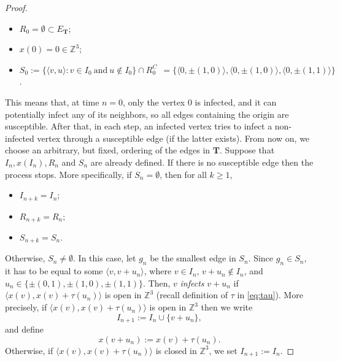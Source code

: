 \documentclass{aptpub}
\newcommand{\Z}{\mathbb{Z}}
\begin{document}
\begin{proof}
\begin{itemize}
    \item $R_0 = \emptyset \subset E_{\mathbf{T}}$;
    
    \item $x(0) = 0 \in \Z^{3}$;
    
    \item $S_0 := \{ \langle v, u \rangle : v \in I_{0} \: \mbox{and} \: u \notin I_{0} \} \cap R_{0}^C \:\: = \{ \langle 0, \pm (1,0)\rangle, \langle 0,\pm (1,0)\rangle ,\langle 0,\pm (1,1)\rangle \}$. 
\end{itemize}

This means that, at time $n=0$, only the vertex $0$ is infected, and it can potentially infect any of its neighbors, so all edges containing the origin are susceptible. After that, in each step, an infected vertex tries to infect a non-infected vertex through a susceptible edge (if the latter exists). From now on, we choose an arbitrary, but fixed, ordering of the edges in $\mathbf{T}$. Suppose that $I_n, x(I_n), R_n$ and $S_n$ are already defined. If there is no susceptible edge then the process stops. More specifically, if $S_n = \emptyset$, then for all $k \geq 1$,
    \begin{itemize}
        \item $I_{n+k} = I_n$;
        
        \item $R_{n+k} = R_n$;
        
        \item $S_{n+k} = S_n$.
    \end{itemize}
Otherwise, $S_n \neq \emptyset$. In this case, let $g_n$ be the smallest edge in $S_n$.
Since $g_n \in S_n$, it has to be equal to some $\langle v, v+u_n \rangle$, where $v \in I_n$, $v+u_n \notin I_n$, and $u_n \in \{ \pm (0,1), \pm (1,0), \pm (1,1)\}$. Then, $v$ \textit{infects} $v+u_n$ if $\langle x(v), x(v)+\tau (u_n) \rangle$ is open in $\Z^{3}$ (recall definition of $\tau$ in \eqref{eq:tau}). More precisely, if $\langle x(v), x(v)+\tau (u_n) \rangle$ is open in $\Z^{3}$ then we write
\begin{equation*}
    I_{n+1} := I_n \cup \{v+u_n\},
\end{equation*}
and define
\begin{equation*}
    x(v+u_n) := x(v) + \tau(u_n).
\end{equation*} 
Otherwise, if $\langle x(v), x(v)+ \tau(u_n) \rangle$ is closed in $\Z^{3}$,  we set $I_{n+1}:= I_n$.




\end{proof}
\end{document}
